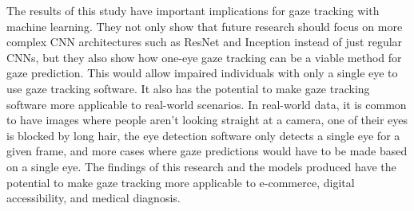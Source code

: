 \documentclass{article}
\begin{document}
The results of this study have important implications for gaze tracking with machine learning. They not only show that future research should focus on more complex CNN architectures such as ResNet and Inception instead of just regular CNNs, but they also show how one-eye gaze tracking can be a viable method for gaze prediction. This would allow impaired individuals with only a single eye to use gaze tracking software. It also has the potential to make gaze tracking software more applicable to real-world scenarios. In real-world data, it is common to have images where people aren't looking straight at a camera, one of their eyes is blocked by long hair, the eye detection software only detects a single eye for a given frame, and more cases where gaze predictions would have to be made based on a single eye. The findings of this research and the models produced have the potential to make gaze tracking more applicable to e-commerce, digital accessibility, and medical diagnosis.



\printbibliography
\end{document}
